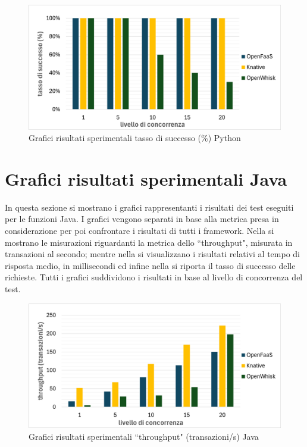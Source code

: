 \documentclass[12pt,a4paper,openany,twoside]{book}
\begin{document}
\begin{figure}[h!]
    \centering
    \includegraphics[width=\linewidth]{figures/graphs/tassoSuccesso_python.pdf}
    \caption{Grafici risultati sperimentali tasso di successo (\%) Python}
    \label{fig:grafici-tasso-successo-python}
\end{figure}


\section{Grafici risultati sperimentali Java}

In questa sezione si mostrano i grafici rappresentanti i risultati dei test eseguiti per le funzioni Java. I grafici vengono separati in base alla metrica presa in considerazione per poi confrontare i risultati di tutti i framework. Nella  si mostrano le misurazioni riguardanti la metrica dello ``throughput", misurata in transazioni al secondo; mentre nella  si visualizzano i risultati relativi al tempo di risposta medio, in millisecondi ed infine nella  si riporta il tasso di successo delle richieste. Tutti i grafici suddividono i risultati in base al livello di concorrenza del test.

\begin{figure}[h!]
    \centering
    \includegraphics[width=\linewidth]{figures/graphs/throughput_java.pdf}
    \caption{Grafici risultati sperimentali ``throughput" (transazioni/s) Java}
    \label{fig:grafici-throughput-java}
\end{figure}
\end{document}
